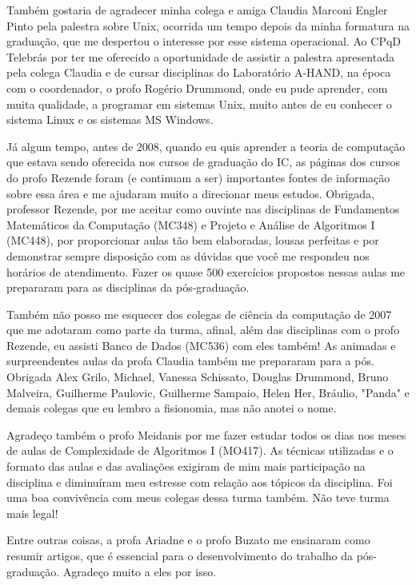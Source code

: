 Também gostaria de agradecer minha colega e amiga Claudia Marconi Engler Pinto pela palestra sobre Unix, ocorrida um tempo depois da minha formatura na graduação, que me despertou o interesse por esse sistema operacional. Ao CPqD Telebrás por ter me oferecido a oportunidade de assistir a palestra apresentada pela colega Claudia e de cursar disciplinas do Laboratório A-HAND, na época com o coordenador, o profo Rogério Drummond, onde eu pude aprender, com muita qualidade, a programar em sistemas Unix, muito antes de eu conhecer o sistema Linux e os sistemas MS Windows.

Já algum tempo, antes de 2008, quando eu quis aprender a teoria de computação que estava sendo oferecida nos cursos de graduação do IC, as páginas dos cursos do profo Rezende foram (e continuam a ser) importantes fontes de informação sobre essa área e me ajudaram muito a direcionar meus estudos. Obrigada, professor Rezende, por me aceitar como ouvinte nas disciplinas de Fundamentos Matemáticos da Computação (MC348) e Projeto e Análise de Algoritmos I (MC448), por proporcionar aulas tão bem elaboradas, lousas perfeitas e por demonstrar sempre disposição com as dúvidas que você me respondeu nos horários de atendimento. Fazer os quase 500 exercícios propostos nessas aulas me prepararam para as disciplinas da pós-graduação.

Também não posso me esquecer dos colegas de ciência da computação de 2007 que me adotaram como parte da turma, afinal, além das disciplinas com o profo Rezende, eu assisti Banco de Dados (MC536) com eles também! As animadas e surpreendentes aulas da profa Claudia também me prepararam para a pós. Obrigada Alex Grilo, Michael, Vanessa Schissato, Douglas Drummond, Bruno Malveira, Guilherme Paulovic, Guilherme Sampaio, Helen Her, Bráulio, "Panda" e demais colegas que eu lembro a fisionomia, mas não anotei o nome.

Agradeço também o profo Meidanis por me fazer estudar todos os dias nos meses de aulas de Complexidade de Algoritmos I (MO417). As técnicas utilizadas e o formato das aulas e das avaliações exigiram de mim mais participação na disciplina e diminuíram meu estresse com relação aos tópicos da disciplina. Foi uma boa convivência com meus colegas dessa turma também. Não teve turma mais legal!

Entre outras coisas, a profa Ariadne e o profo Buzato me ensinaram como resumir artigos, que é essencial para o desenvolvimento do trabalho da pós-graduação. Agradeço muito a eles por isso.

